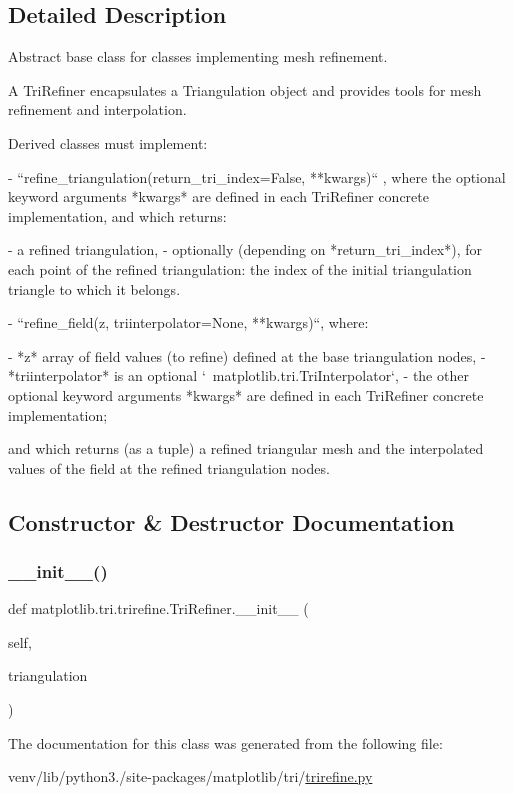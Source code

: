 \subsection{Detailed Description}
\begin{DoxyVerb}Abstract base class for classes implementing mesh refinement.

A TriRefiner encapsulates a Triangulation object and provides tools for
mesh refinement and interpolation.

Derived classes must implement:

- ``refine_triangulation(return_tri_index=False, **kwargs)`` , where
  the optional keyword arguments *kwargs* are defined in each
  TriRefiner concrete implementation, and which returns:

  - a refined triangulation,
  - optionally (depending on *return_tri_index*), for each
    point of the refined triangulation: the index of
    the initial triangulation triangle to which it belongs.

- ``refine_field(z, triinterpolator=None, **kwargs)``, where:

  - *z* array of field values (to refine) defined at the base
    triangulation nodes,
  - *triinterpolator* is an optional `~matplotlib.tri.TriInterpolator`,
  - the other optional keyword arguments *kwargs* are defined in
    each TriRefiner concrete implementation;

  and which returns (as a tuple) a refined triangular mesh and the
  interpolated values of the field at the refined triangulation nodes.
\end{DoxyVerb}
 

\subsection{Constructor \& Destructor Documentation}
\mbox{\label{classmatplotlib_1_1tri_1_1trirefine_1_1TriRefiner_ab3355dfed0de7977f62f0e4ee3901014}} 
\subsubsection{\texorpdfstring{\+\_\+\+\_\+init\+\_\+\+\_\+()}{\_\_init\_\_()}}
{\footnotesize\ttfamily def matplotlib.\+tri.\+trirefine.\+Tri\+Refiner.\+\_\+\+\_\+init\+\_\+\+\_\+ (\begin{DoxyParamCaption}\item[{}]{self,  }\item[{}]{triangulation }\end{DoxyParamCaption})}



The documentation for this class was generated from the following file\+:\begin{DoxyCompactItemize}
\item 
venv/lib/python3./site-\/packages/matplotlib/tri/\hyperlink{trirefine_8py}{trirefine.\+py}\end{DoxyCompactItemize}
